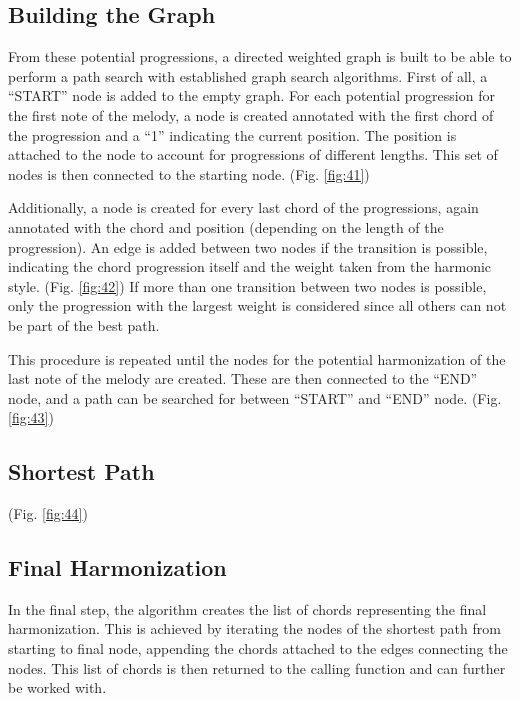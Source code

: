 \subsection{Building the Graph}
From these potential progressions, a directed weighted graph is built to be able to perform a path search with established graph search algorithms. First of all, a ``START'' node is added to the empty graph. For each potential progression for the first note of the melody, a node is created annotated with the first chord of the progression and a ``1'' indicating the current position. The position is attached to the node to account for progressions of different lengths. This set of nodes is then connected to the starting node. (Fig. \ref{fig:41})

Additionally, a node is created for every last chord of the progressions, again annotated with the chord and position (depending on the length of the progression). An edge is added between two nodes if the transition is possible, indicating the chord progression itself and the weight taken from the harmonic style. (Fig. \ref{fig:42}) If more than one transition between two nodes is possible, only the progression with the largest weight is considered since all others can not be part of the best path.

This procedure is repeated until the nodes for the potential harmonization of the last note of the melody are created. These are then connected to the ``END'' node, and a path can be searched for between ``START'' and ``END'' node. (Fig. \ref{fig:43})


\subsection{Shortest Path}
(Fig. \ref{fig:44})

\subsection{Final Harmonization}
In the final step, the algorithm creates the list of chords representing the final harmonization. This is achieved by iterating the nodes of the shortest path from starting to final node, appending the chords attached to the edges connecting the nodes. This list of chords is then returned to the calling function and can further be worked with.

